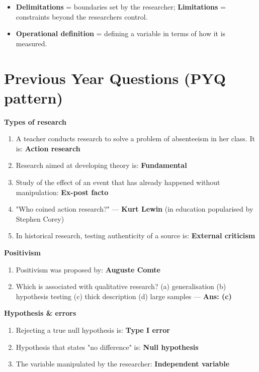 \begin{itemize}
\tightlist
\item
  \textbf{Delimitations} = boundaries set by the researcher; \textbf{Limitations} = constraints beyond the researcher\textquotesingle s control.
\item
  \textbf{Operational definition} = defining a variable in terms of how it is measured.
\end{itemize}

\needspace{125pt}

\hypertarget{p1-02--previous-year-questions-pyq-pattern}{%
\section{Previous Year Questions (PYQ pattern)}\label{p1-02--previous-year-questions-pyq-pattern}}

\textbf{Types of research}

\begin{enumerate}
\def\labelenumi{\arabic{enumi}.}
\tightlist
\item
  A teacher conducts research to solve a problem of absenteeism in her class. It is: \textbf{Action research}
\item
  Research aimed at developing theory is: \textbf{Fundamental}
\item
  Study of the effect of an event that has already happened without manipulation: \textbf{Ex-post facto}
\item
  "Who coined action research?" --- \textbf{Kurt Lewin} (in education popularised by Stephen Corey)
\item
  In historical research, testing authenticity of a source is: \textbf{External criticism}
\end{enumerate}

\textbf{Positivism}

\begin{enumerate}
\def\labelenumi{\arabic{enumi}.}
\setcounter{enumi}{5}
\tightlist
\item
  Positivism was proposed by: \textbf{Auguste Comte}
\item
  Which is associated with qualitative research? (a) generalisation (b) hypothesis testing (c) thick description (d) large samples --- \textbf{Ans: (c)}
\end{enumerate}

\textbf{Hypothesis \& errors}

\begin{enumerate}
\def\labelenumi{\arabic{enumi}.}
\setcounter{enumi}{7}
\tightlist
\item
  Rejecting a true null hypothesis is: \textbf{Type I error}
\item
  Hypothesis that states "no difference" is: \textbf{Null hypothesis}
\item
  The variable manipulated by the researcher: \textbf{Independent variable}
\end{enumerate}

